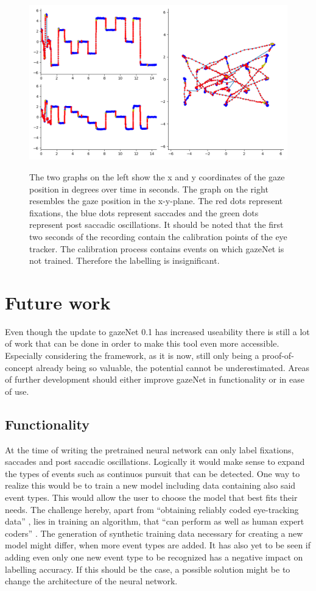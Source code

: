 \documentclass[conference]{IEEEtran}
\begin{document}
\begin{figure}
    \centering
    \includegraphics[width=0.6\linewidth]
    {Kreuze_Random Recording1_short}
    \label{fig:kreuze}
    \caption{The two graphs on the left show the x and y coordinates of the gaze position in degrees over time in seconds. The graph on the right resembles the gaze position in the x-y-plane. The red dots represent fixations, the blue dots represent saccades and the green dots represent post saccadic oscillations. It should be noted that the first two seconds of the recording contain the calibration points of the eye tracker. The calibration process contains events on which gazeNet is not trained. Therefore the labelling is insignificant.}
\end{figure}

\section{Future work}
Even though the update to gazeNet 0.1 has increased useability there is still a lot of work that can be done in order to make this tool even more accessible. Especially considering the framework, as it is now, still only being a proof-of-concept already being so valuable, the potential cannot be underestimated. Areas of further development should either improve gazeNet in functionality or in ease of use.

\subsection{Functionality}
At the time of writing the pretrained neural network can only label fixations, saccades and post saccadic oscillations. Logically it would make sense to expand the types of events such as continuos pursuit that can be detected. One way to realize this would be to train a new model including data containing also said event types. This would allow the user to choose the model that best fits their needs. The challenge hereby, apart from ``obtaining reliably coded eye-tracking data'' \citet{zemblys2018gazeNet}, lies in training an algorithm, that ``can perform as well as human expert coders'' \citet{zemblys2018gazeNet}. The generation of synthetic training data necessary for creating a new model might differ, when more event types are added. It has also yet to be seen if adding even only one new event type to be recognized has a negative impact on labelling accuracy. If this should be the case, a possible solution might be to change the architecture of the neural network.
\end{document}
